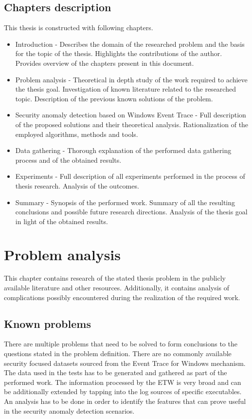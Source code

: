 \documentclass[a4paper,twoside,12pt]{book}
\begin{document}
\section{Chapters description}

This thesis is constructed with following chapters.
\begin{itemize}
	\item Introduction - Describes the domain of the researched problem and the basis for the 
	topic of the thesis. Highlights the contributions of the author. Provides overview of the 
	chapters present in this document.
	\item Problem analysis - Theoretical in depth study of the work required to achieve the thesis
	goal. Investigation of known literature related to the researched topic. Description of the 
	previous known solutions of the problem. 
	\item Security anomaly detection based on Windows Event Trace - Full description of the proposed
	solutions and their theoretical analysis. Rationalization of the employed algorithms, methods 
	and tools.
	\item Data gathering - Thorough explanation of the performed data gathering process and of 
	the obtained results.
 	\item Experiments - Full description of all experiments performed in the process of thesis 
 	research. Analysis of the outcomes.
	\item Summary - Synopsis of the performed work. Summary of all the resulting conclusions and 
	possible future research directions. Analysis of the thesis goal in light of the obtained
	results. 
\end{itemize}

\chapter{Problem analysis}

This chapter contains research of the stated thesis problem in the publicly available  
literature and other resources. Additionally, it contains analysis of complications possibly encountered
during the realization of the required work.  

\section{Known problems}
There are multiple problems that need to be solved to form conclusions to the questions stated in the
problem definition.
There are no commonly available security focused datasets sourced from the Event Trace for 
Windows mechanism. The data used in the tests has to be generated and gathered as part of the
performed work. The information processed by the ETW is very broad and can be additionally extended 
by tapping into the log sources of specific executables.
An analysis has to be done in order to identify the features that can prove useful in the security
anomaly detection scenarios. 
\end{document}

